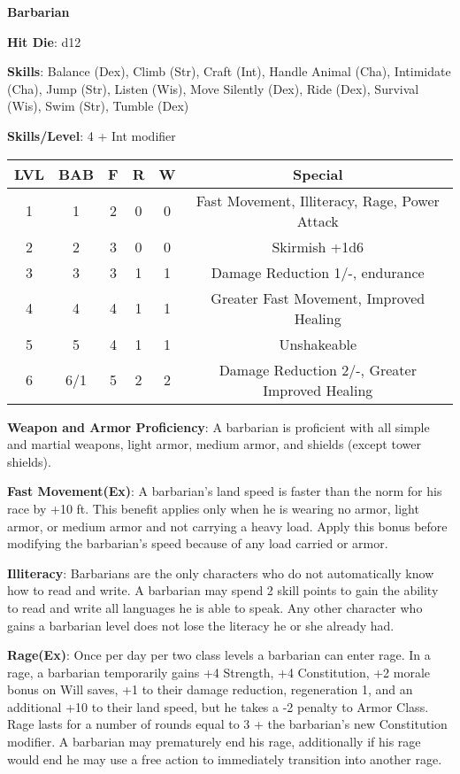 \textbf{\huge{Barbarian}}

\textbf{Hit Die}: d12

\textbf{Skills}: Balance (Dex), Climb (Str), Craft (Int), Handle Animal (Cha), Intimidate (Cha), Jump (Str), Listen (Wis), Move Silently (Dex), Ride (Dex), Survival (Wis), Swim (Str), Tumble (Dex)

\textbf{Skills/Level}: 4 + Int modifier

\begin{center}
\begin{adjustwidth}{-4cm}{}
\begin{small}
\begin{tabular}{| c | c | c | c | c | c |}
\hline
LVL &BAB &F &R &W &Special \\
\hline
1 &1 &2 &0 &0 &Fast Movement, Illiteracy, Rage, Power Attack \\
2 &2 &3 &0 &0 &Skirmish +1d6 \\
3 &3 &3 &1 &1 &Damage Reduction 1/-, endurance \\
4 &4 &4 &1 &1 &Greater Fast Movement, Improved Healing \\
5 &5 &4 &1 &1 &Unshakeable \\
6 &6/1 &5 &2 &2 &Damage Reduction 2/-, Greater Improved Healing \\
\hline
\end{tabular}
\end{small}
\end{adjustwidth}
\end{center}

\textbf{Weapon and Armor Proficiency}: A barbarian is proficient with all simple and martial weapons, light armor, medium armor, and shields (except tower shields).

\textbf{Fast Movement(Ex)}: A barbarian's land speed is faster than the norm for his race by +10 ft. This benefit applies only when he is wearing no armor, light armor, or medium armor and not carrying a heavy load. Apply this bonus before modifying the barbarian's speed because of any load carried or armor.

\textbf{Illiteracy}: Barbarians are the only characters who do not automatically know how to read and write. A barbarian may spend 2 skill points to gain the ability to read and write all languages he is able to speak. Any other character who gains a barbarian level does not lose the literacy he or she already had.

\textbf{Rage(Ex)}: Once per day per two class levels a barbarian can enter rage. In a rage, a barbarian temporarily gains +4 Strength, +4 Constitution, +2 morale bonus on Will saves, +1 to their damage reduction, regeneration 1, and an additional +10 to their land speed, but he takes a -2 penalty to Armor Class. Rage lasts for a number of rounds equal to 3 + the barbarian's new Constitution modifier. A barbarian may prematurely end his rage, additionally if his rage would end he may use a free action to immediately transition into another rage.

